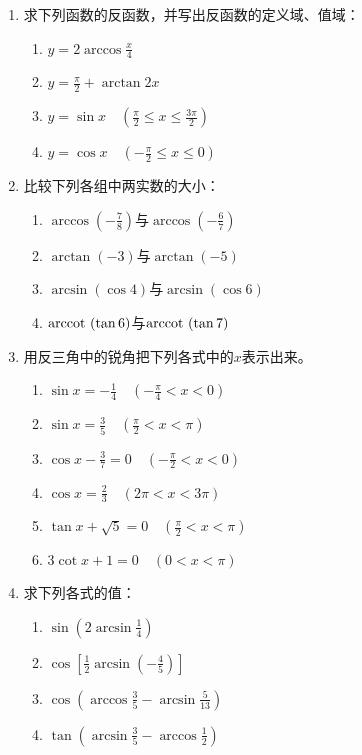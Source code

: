 \begin{enumerate}
    \item 求下列函数的反函数，并写出反函数的定义域、值域：
\begin{multicols}{2}
\begin{enumerate}[(1)]
    \item $y=2\arccos\frac{x}{4}$
    \item $y=\frac{\pi}{2}+\arctan 2x$
    \item $y=\sin x\quad \left(\frac{\pi}{2}\le x\le \frac{3\pi}{2}\right)$
    \item $y=\cos x\quad \left(-\frac{\pi}{2}\le x\le 0\right)$
\end{enumerate}
\end{multicols}

\item 比较下列各组中两实数的大小：
\begin{multicols}{2}
\begin{enumerate}[(1)]
    \item $\arccos\left(-\frac{7}{8}\right)$与$\arccos\left(-\frac{6}{7}\right)$
    \item $\arctan\left(-3\right)$与$\arctan\left(-5\right)$
    \item $\arcsin\left(\cos 4\right)$与$\arcsin\left(\cos 6\right)$
    \item ${\rm arccot\,}\left(\tan 6\right)$与${\rm arccot\,}\left(\tan {7}\right)$
\end{enumerate}
\end{multicols}

\item 用反三角中的锐角把下列各式中的$x$表示出来。
\begin{multicols}{2}
\begin{enumerate}[(1)]
    \item $\sin x=-\frac{1}{4}\quad \left(-\frac{\pi}{4}<x<0\right)$
    \item $\sin x=\frac{3}{5}\quad \left(\frac{\pi}{2}<x<\pi\right)$
    \item $\cos x-\frac{3}{7}=0\quad \left(-\frac{\pi}{2}<x<0\right)$
    \item $\cos x=\frac{2}{3}\quad \left(2\pi<x<3\pi\right)$
    \item $\tan x+\sqrt{5}=0\quad \left(\frac{\pi}{2}<x<\pi\right)$
    \item $3\cot x+1=0\quad \left(0<x<\pi\right)$
\end{enumerate}
\end{multicols}

\item 求下列各式的值：
\begin{multicols}{2}
\begin{enumerate}[(1)]
    \item $\sin\left(2\arcsin \frac{1}{4}\right)$
    \item $\cos\left[\frac{1}{2}\arcsin \left(-\frac{4}{5}\right)\right]$
    \item $\cos\left(\arccos\frac{3}{5}-\arcsin\frac{5}{13} \right)$
    \item $\tan\left(\arcsin \frac{3}{5}-\arccos\frac{1}{2}\right)$
\end{enumerate}
\end{multicols}


\end{enumerate}

